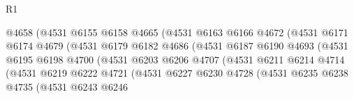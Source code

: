 \begin{lexlean}{R1}
\begin{coremodule}
                                    @4658
                                    (@4531
                                      @6155
                                      @6158
                                      @4665
                                      (@4531
                                        @6163
                                        @6166
                                        @4672
                                        (@4531
                                          @6171
                                          @6174
                                          @4679
                                          (@4531
                                            @6179
                                            @6182
                                            @4686
                                            (@4531
                                              @6187
                                              @6190
                                              @4693
                                              (@4531
                                                @6195
                                                @6198
                                                @4700
                                                (@4531
                                                  @6203
                                                  @6206
                                                  @4707
                                                  (@4531
                                                    @6211
                                                    @6214
                                                    @4714
                                                    (@4531
                                                      @6219
                                                      @6222
                                                      @4721
                                                      (@4531
                                                        @6227
                                                        @6230
                                                        @4728
                                                        (@4531
                                                          @6235
                                                          @6238
                                                          @4735
                                                          (@4531
                                                            @6243
                                                            @6246

\end{coremodule}
\end{lexlean}
